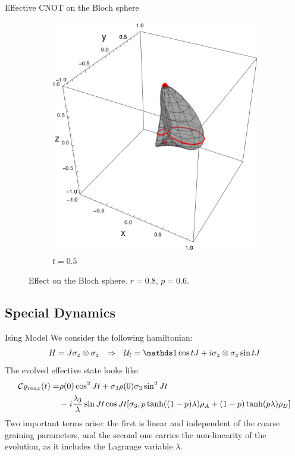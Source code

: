 \begin{frame}{Effective CNOT on the Bloch sphere}
\begin{figure}[h!]
\begin{subfigure}{0.32\textwidth}
            \includegraphics[width=0.9\linewidth]{figures/sphere_CNOT_t=1.0_z=0.8_p=0.6.png}
            \caption{$t=0.5$}
        \end{subfigure}
        \caption{Effect on the Bloch sphere. $r=0.8$, $p=0.6$.}
    \end{figure}
\end{frame}

\subsection{Special Dynamics}

\begin{frame}{Ising Model}
    We consider the following hamiltonian:
    \begin{align*}
        H=J\sigma_{z}\otimes\sigma_{z} && \Rightarrow && \mcU_{t}=\Id \cos{tJ} + i\sigma_{z}\otimes\sigma_{z}\sin{tJ}
    \end{align*}
    The evolved effective state looks like
    \begin{align*}
        \mathcal{C}{\varrho_{max}(t)}=&\rho(0)\cos^{2}{Jt}+\sigma_{3}\rho(0)\sigma_{3}\sin^{2}{Jt}\\
        &-i\frac{\lambda_{3}}{\lambda}\sin{Jt}\cos{Jt}[\sigma_{3},p\tanh((1-p)\lambda)\rho_{A}+(1-p)\tanh(p\lambda)\rho_{B}]
    \end{align*}
    Two important terms arise: the first is linear and independent of the coarse graining parameters, and the second one carries the non-linearity of the evolution, as it includes the Lagrange variable $\lambda$.
\end{frame}